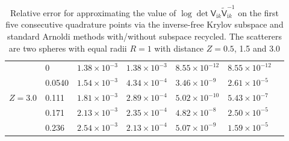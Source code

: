 \begin{table}[H]
\begin{tabular}{ |M{1.5cm}|M{1.7cm}|M{2.2cm} |M{2.2cm}|M{2.2cm}|M{3cm}|M{2.2cm}| }
    \hline
    \hline
       & 0        & $1.38\times 10^{-3}$  & $1.38\times 10^{-3}$  &$8.55\times 10^{-12}$ &$8.55\times 10^{-12}$\\ 
                                   & 0.0540   & $1.54\times 10^{-3}$  & $4.34\times 10^{-4}$  &$3.46\times 10^{-9}$  &$2.61\times 10^{-5}$\\ 
                                   & 0.111    & $1.81\times 10^{-3}$  & $2.89\times 10^{-4}$  &$5.02\times 10^{-10}$ &$5.43\times 10^{-7}$\\ 
                                   & 0.171    & $2.13\times 10^{-3}$  & $2.35\times 10^{-4}$  &$4.82\times 10^{-8}$  &$2.50\times 10^{-5}$\\ 
                                   & 0.236    & $2.54\times 10^{-3}$  & $2.13\times 10^{-4}$  &$5.07\times 10^{-9}$  &$1.59\times 10^{-5}$\\ 
    \hline
    \end{tabular}
    \caption{Relative error for approximating the value of $\log\det\mathsf{V}_{\mathrm{i}k}\tilde{\mathsf{V}}_{\mathrm{i}k}^{-1}$ on the first five consecutive 
    quadrature points via the inverse-free Krylov subspace and standard Arnoldi methods with/without subspace recycled. The scatterers are two spheres with 
    equal radii $R = 1$ with distance $Z = 0.5$, 1.5 and 3.0}
    \label{Table lists the logdet}
    \end{table}

